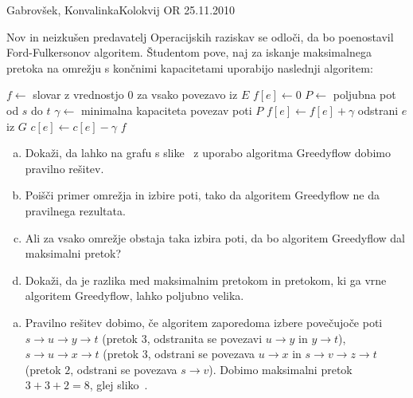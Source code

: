 \begin{naloga}{Gabrovšek, Konvalinka}{Kolokvij OR 25.11.2010}
\begin{vprasanje}
Nov in neizkušen predavatelj Operacijskih raziskav se odloči,
da bo poenostavil Ford-Fulkersonov algoritem.
Študentom pove,
naj za iskanje maksimalnega pretoka na omrežju s končnimi kapacitetami
uporabijo naslednji algoritem:
\begin{small}
\begin{algorithmic}
    \State $f \gets$ slovar z vrednostjo $0$ za vsako povezavo iz $E$
        \State $f[e] \gets 0$
    \EndFor
        \State $P \gets$ poljubna pot od $s$ do $t$
        \State $\gamma \gets$ minimalna kapaciteta povezav poti $P$
            \State $f[e] \gets f[e] + \gamma$
                \State odstrani $e$ iz $G$
            \Else
                \State $c[e] \gets c[e] - \gamma$
            \EndIf
        \EndFor
    \EndWhile
    \State \Return $f$
\EndFunction
\end{algorithmic}
\end{small}

\begin{enumerate}[(a)]
\item Dokaži,
da lahko na grafu s slike~\fig
z uporabo algoritma {\sc Greedyflow} dobimo pravilno rešitev.

\item Poišči primer omrežja in izbire poti,
tako da algoritem {\sc Greedyflow} ne da pravilnega rezultata.

\item Ali za vsako omrežje obstaja taka izbira poti,
da bo algoritem {\sc Greedyflow} dal maksimalni pretok?

\item Dokaži, da je razlika med maksimalnim pretokom in pretokom,
ki ga vrne algoritem {\sc Greedyflow}, lahko poljubno velika.
\end{enumerate}

\begin{slika}
\pgfslika
{}
\end{slika}
\end{vprasanje}

\begin{odgovor}
\begin{enumerate}[(a)]
\item Pravilno rešitev dobimo,
če algoritem zaporedoma izbere povečujoče poti $s \to u \to y \to t$
(pretok $3$, odstranita se povezavi $u \to y$ in $y \to t$),
$s \to u \to x \to t$ (pretok $3$, odstrani se povezava $u \to x$
in $s \to v \to z \to t$ (pretok $2$, odstrani se povezava $s \to v$).
Dobimo maksimalni pretok $3+3+2 = 8$, glej sliko~.


\end{enumerate}
\end{odgovor}
\end{naloga}
